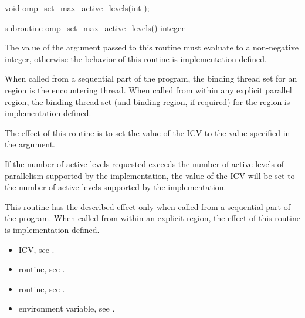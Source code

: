 \format
\begin{ccppspecific}
\begin{ompcFunction}
void omp_set_max_active_levels(int );
\end{ompcFunction}
\end{ccppspecific}

\begin{fortranspecific}
\begin{ompfSubroutine}
subroutine omp_set_max_active_levels()
integer 
\end{ompfSubroutine}
\end{fortranspecific}

\constraints
The value of the argument passed to this routine must evaluate to a non-negative integer,
otherwise the behavior of this routine is implementation defined.

\binding
When called from a sequential part of the program, the binding thread set for an
 region is the encountering thread. When called
from within any explicit parallel region, the binding thread set (and binding region, if
required) for the  region is implementation defined.

\effect
The effect of this routine is to set the value of the  ICV to the value
specified in the argument.

If the number of active levels requested exceeds the number of
active levels of parallelism
supported by the implementation, the value of the  ICV will be set
to the number of active levels supported by the implementation.

This routine has the described effect only when called from a sequential part of the
program. When called from within an explicit  region, the effect of this
routine is implementation defined.

\crossreferences
\begin{itemize}
\item {} ICV, see
.

\item {} routine, see
.

\item {} routine, see
.

\item {} environment variable, see
.
\end{itemize}










